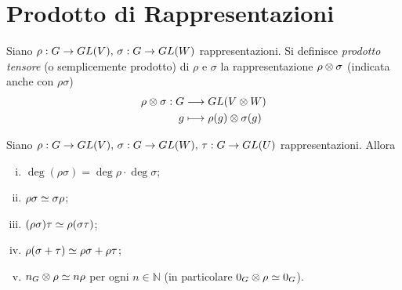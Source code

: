 \section{Prodotto di Rappresentazioni}

\begin{definition}
Siano $\rho:G\to GL(V),\,\allowbreak\sigma:G\to GL(W)$ rappresentazioni. Si definisce \emph{prodotto tensore} (o semplicemente prodotto) di $\rho$ e $\sigma$ la rappresentazione $\rho\otimes \sigma$ (indicata anche con $\rho\sigma$)
\begin{align*}
\rho\otimes\sigma:G&\longrightarrow GL(V\otimes W)\\
g&\longmapsto \rho(g)\otimes\sigma(g)
\end{align*}
\end{definition}

\begin{proposition}
Siano $\rho:G\to GL(V),\,\allowbreak\sigma:G\to GL(W),\,\allowbreak\tau:G\to GL(U)$ rappresentazioni. Allora
\begin{enumerate}[(i)]
\item $\deg(\rho\sigma)=\deg\rho\cdot\deg\sigma$;
\item $\rho\sigma\simeq\sigma\rho$;
\item $(\rho\sigma)\tau\simeq\rho(\sigma\tau)$;
\item $\rho(\sigma+\tau)\simeq\rho\sigma+\rho\tau$;
\item $n_G\otimes\rho\simeq n\rho$ per ogni $n\in\mathbb{N}$ (in particolare $0_G\otimes\rho\simeq 0_G$).
\end{enumerate}
\end{proposition}
